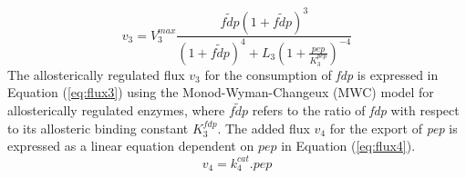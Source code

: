 \documentclass[10pt]{report}
\begin{document}
	\begin{equation}\label{eq:flux3}
	v_3 = V_{3}^{max}\frac{\tilde{fdp}\left(1+\tilde{fdp}\right)^3}{\left(1+\tilde{fdp}\right)^4+L_3\left(1+\frac{pep}{K_{3}^{pep}}\right)^{-4}}
	\end{equation}
	The allosterically regulated flux $v_3$ for the consumption of \textit{fdp} is expressed in Equation (\ref{eq:flux3}) using the Monod-Wyman-Changeux (MWC) model for allosterically regulated enzymes, where $\tilde{fdp}$ refers to the ratio of \textit{fdp} with respect to its allosteric binding constant $K_{3}^{fdp}$. The added flux $v_4$ for the export of \textit{pep} is expressed as a linear equation dependent on $pep$ in Equation (\ref{eq:flux4}).
	\begin{equation}\label{eq:flux4}
	v_4 = k_{4}^{cat}.pep
	\end{equation}
\end{document}
